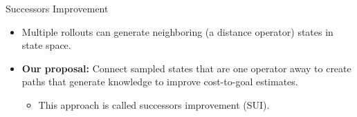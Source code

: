 \documentclass{gkibeamer}
\begin{document}
\begin{frame}{Successors Improvement}
\begin{itemize}
    \item Multiple rollouts can generate neighboring (a distance operator) states in state space.

    \bigskip \pause
    
    \item \textbf{Our proposal:} Connect sampled states that are one operator away to create paths that generate knowledge to improve cost-to-goal estimates.
    \begin{itemize}
        \item This approach is called \alert{successors improvement} (SUI).
    \end{itemize}
\end{itemize}
\end{frame}
\end{document}
